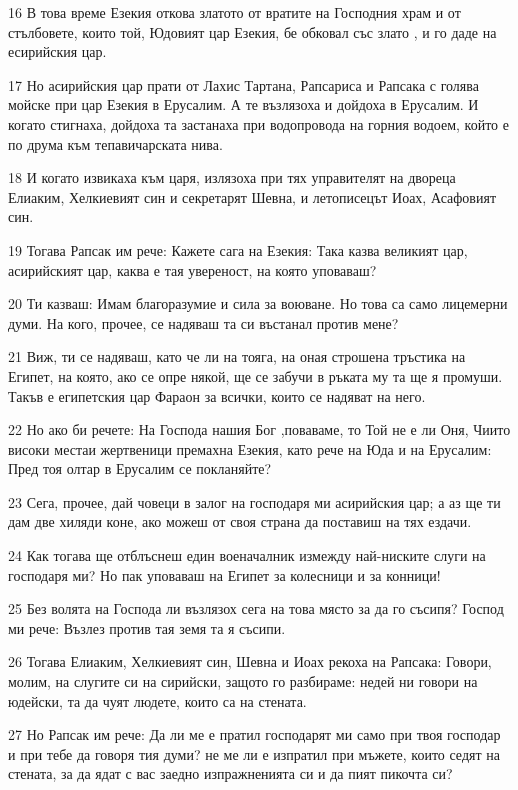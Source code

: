 \par 16 В това време Езекия откова златото от вратите на Господния храм и от стълбовете, които той, Юдовият цар Езекия, бе обковал със злато , и го даде на есирийския цар.
\par 17 Но асирийския цар прати от Лахис Тартана, Рапсариса и Рапсака с голява мойске при цар Езекия в Ерусалим. А те възлязоха и дойдоха в Ерусалим. И когато стигнаха, дойдоха та застанаха при водопровода на горния водоем, който е по друма към тепавичарската нива.
\par 18 И когато извикаха към царя, излязоха при тях управителят на двореца Елиаким, Хелкиевият син и секретарят Шевна, и летописецът Иоах, Асафовият син.
\par 19 Тогава Рапсак им рече: Кажете сага на Езекия: Така казва великият цар, асирийският цар, каква е тая увереност, на която уповаваш?
\par 20 Ти казваш: Имам благоразумие и сила за воюване. Но това са само лицемерни думи. На кого, прочее, се надяваш та си въстанал против мене?
\par 21 Виж, ти се надяваш, като че ли на тояга, на оная строшена тръстика на Египет, на която, ако се опре някой, ще се забучи в ръката му та ще я промуши. Такъв е египетския цар Фараон за всички, които се надяват на него.
\par 22 Но ако би речете: На Господа нашия Бог ,поваваме, то Той не е ли Оня, Чиито високи местаи жертвеници премахна Езекия, като рече на Юда и на Ерусалим: Пред тоя олтар в Ерусалим се покланяйте?
\par 23 Сега, прочее, дай човеци в залог на господаря ми асирийския цар; а аз ще ти дам две хиляди коне, ако можеш от своя страна да поставиш на тях ездачи.
\par 24 Как тогава ще отблъснеш един военачалник измежду най-ниските слуги на господаря ми? Но пак уповаваш на Египет за колесници и за конници!
\par 25 Без волята на Господа ли възлязох сега на това място за да го съсипя? Господ ми рече: Възлез против тая земя та я съсипи.
\par 26 Тогава Елиаким, Хелкиевият син, Шевна и Иоах рекоха на Рапсака: Говори, молим, на слугите си на сирийски, защото го разбираме: недей ни говори на юдейски, та да чуят людете, които са на стената.
\par 27 Но Рапсак им рече: Да ли ме е пратил господарят ми само при твоя господар и при тебе да говоря тия думи? не ме ли е изпратил при мъжете, които седят на стената, за да ядат с вас заедно изпражненията си и да пият пикочта си?
